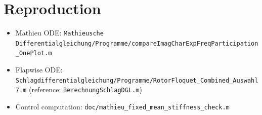 \documentclass[11pt,a4paper]{article}
\begin{document}
\section{Reproduction}
\begin{itemize}
  \item Mathieu ODE: \texttt{Mathieusche Differentialgleichung/Programme/compareImagCharExpFreqParticipation\_OnePlot.m}
  \item Flapwise ODE: \texttt{Schlagdifferentialgleichung/Programme/RotorFloquet\_Combined\_Auswahl7.m}
        (reference: \texttt{BerechnungSchlagDGL.m})
  \item Control computation: \texttt{doc/mathieu\_fixed\_mean\_stiffness\_check.m}
\end{itemize}
\end{document}
